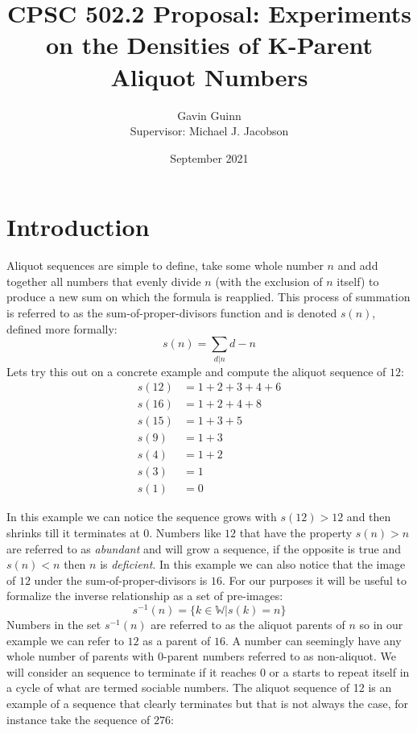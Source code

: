 \documentclass{article}
\title{CPSC 502.2 Proposal: Experiments on
the Densities of K-Parent Aliquot Numbers}
\author{Gavin Guinn\\[.5cm]{\small Supervisor: Michael J. Jacobson}}
\date{September 2021}
\theoremstyle{definition}
\begin{document}
\maketitle
\section{Introduction}

Aliquot sequences are simple to define, take some whole number $n$ and add together all numbers that evenly divide $n$ (with the exclusion of $n$ itself) to produce a new sum on which the formula is reapplied. This process of summation is referred to as the sum-of-proper-divisors function and is denoted $s(n)$, defined more formally: 
$$s(n) = \sum_{d|n} d - n$$
Lets try this out on a concrete example and compute the aliquot sequence of $12$:
\begin{align*}
    s(12) &= 1 + 2 + 3 + 4 + 6\\  
    s(16) &= 1 + 2 + 4 + 8\\
    s(15) &= 1 + 3 + 5\\
    s(9) &= 1 + 3\\
    s(4) &= 1 + 2\\
    s(3) &= 1\\
    s(1) &= 0 
\end{align*}

 In this example we can notice the sequence grows with $s(12) > 12$ and then shrinks till it terminates at $0$. Numbers like $12$ that have the property $s(n) > n$ are referred to as \textit{abundant} and will grow a sequence, if the opposite is true and $s(n) < n$ then $n$ is \textit{deficient}. In this example we can also notice that the image of $12$ under the sum-of-proper-divisors is $16$. For our purposes it will be useful to formalize the inverse relationship as a set of pre-images: 
 $$s^{-1}(n) = \{k \in \mathbb{W} | s(k) = n \}$$
 Numbers in the set $s^{-1}(n)$ are referred to as the aliquot parents of $n$ so in our example we can refer to $12$ as a parent of $16$. A number can seemingly have any whole number of parents with 0-parent numbers referred to as non-aliquot. We will consider an sequence to terminate if it reaches 0 or a starts to repeat itself in a cycle of what are termed sociable numbers. The aliquot sequence of 12 is an example of a sequence that clearly terminates but that is not always the case, for instance take the sequence of $276$:
\end{document}
